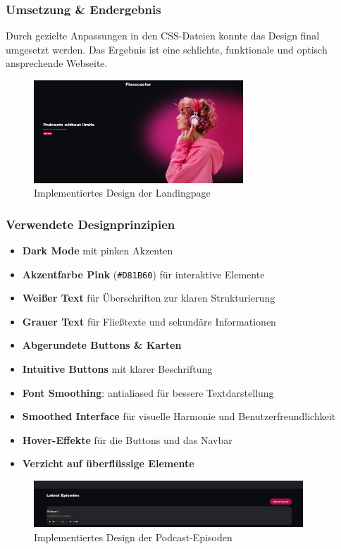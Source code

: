 \documentclass{article}
\begin{document}
\subsubsection{Umsetzung \& Endergebnis}
Durch gezielte Anpassungen in den CSS-Dateien konnte das Design final umgesetzt werden. Das Ergebnis ist eine schlichte, funktionale und optisch ansprechende Webseite.

\begin{figure}[h]
  \caption{Implementiertes Design der Landingpage}
  \centering
  \includegraphics[width=0.7\textwidth]{flosscaster3.png}
\end{figure}

\subsubsection{Verwendete Designprinzipien}

\begin{itemize}
  \item \textbf{Dark Mode} mit pinken Akzenten
  \item \textbf{Akzentfarbe Pink} (\texttt{\#D81B60}) für interaktive Elemente
  \item \textbf{Weißer Text} für Überschriften zur klaren Strukturierung
  \item \textbf{Grauer Text} für Fließtexte und sekundäre Informationen
  \item \textbf{Abgerundete Buttons \& Karten}
  \item \textbf{Intuitive Buttons} mit klarer Beschriftung
  \item \textbf{Font Smoothing}: antialiased für bessere Textdarstellung
  \item \textbf{Smoothed Interface} für visuelle Harmonie und Benutzerfreundlichkeit
  \item \textbf{Hover-Effekte} für die Buttons und das Navbar
  \item \textbf{Verzicht auf überflüssige Elemente}
\end{itemize}

\begin{figure}[h]
  \caption{Implementiertes Design der Podcast-Episoden}
  \centering
  \includegraphics[width=0.9\textwidth]{flosscaster4.png}
\end{figure}
\end{document}
